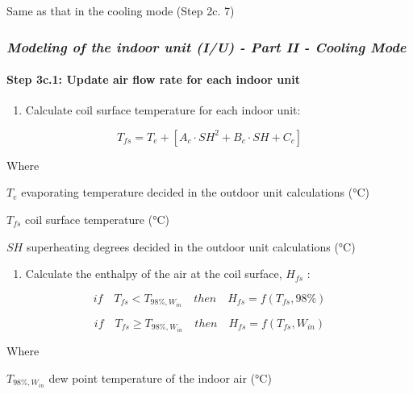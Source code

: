 Same as that in the cooling mode (Step 2c. 7)

\subsubsection{\texorpdfstring{\emph{Modeling of the indoor unit (I/U) - Part II - Cooling Mode}}{Modeling of the indoor unit (I/U) - Part II - Cooling Mode}}\label{modeling-of-the-indoor-unit-iu---part-ii---cooling-mode}

\paragraph{Step 3c.1: Update air flow rate for each indoor unit}\label{step-3c.1-update-air-flow-rate-for-each-indoor-unit}

\begin{enumerate}
\def\labelenumi{(\arabic{enumi})}
\tightlist
\item
  Calculate coil surface temperature for each indoor unit:
\end{enumerate}

\begin{equation}
T_{fs} = T_e+[A_c\cdot SH^2+B_c\cdot SH+C_c]
\end{equation}

Where

\(T_e\) evaporating temperature decided in the outdoor unit calculations (°C)

\(T_{fs}\) coil surface temperature (°C)

\(SH\) superheating degrees decided in the outdoor unit calculations (°C)

\begin{enumerate}
\def\labelenumi{\arabic{enumi})}
\setcounter{enumi}{1}
\tightlist
\item
  Calculate the enthalpy of the air at the coil surface, \(H_{fs}\) :
\end{enumerate}

\begin{equation}
if\quad{T_{fs}}<T_{98\%,W_{in}}\quad{then}\quad{H_{fs}} = f(T_{fs},98\%)
\end{equation}

\begin{equation}
if\quad{T_{fs}}\ge{T_{98\%,W_{in}}}\quad{then}\quad{H_{fs}} = f(T_{fs},W_{in})
\end{equation}

Where

\(T_{98\%,W_{in}}\) dew point temperature of the indoor air (°C)

